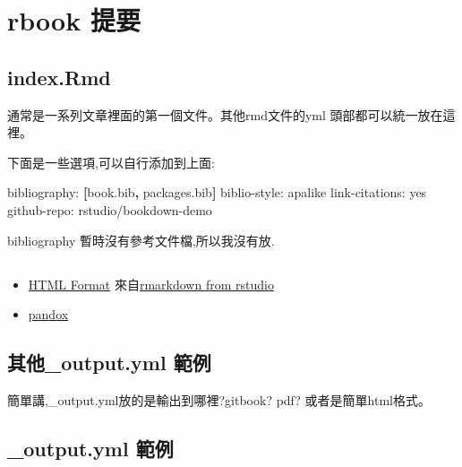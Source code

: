 \documentclass[]{book}
\newenvironment{Shaded}{\begin{snugshade}}{\end{snugshade}}
\newcommand{\AttributeTok}[1]{\textcolor[rgb]{0.77,0.63,0.00}{#1}}
\newcommand{\FunctionTok}[1]{\textcolor[rgb]{0.00,0.00,0.00}{#1}}
\newcommand{\KeywordTok}[1]{\textcolor[rgb]{0.13,0.29,0.53}{\textbf{#1}}}
\newcommand{\NormalTok}[1]{#1}
\providecommand{\tightlist}{%
  \setlength{\itemsep}{0pt}\setlength{\parskip}{0pt}}
\theoremstyle{definition}
\theoremstyle{definition}
\theoremstyle{definition}
\theoremstyle{remark}
\begin{document}
\hypertarget{rbook-}{%
\chapter{rbook 提要}\label{rbook-}}

\hypertarget{index.rmd}{%
\section{index.Rmd}\label{index.rmd}}

通常是一系列文章裡面的第一個文件。其他rmd文件的yml
頭部都可以統一放在這裡。

下面是一些選項,可以自行添加到上面:

\begin{Shaded}
\begin{Highlighting}[]
\FunctionTok{bibliography:}\AttributeTok{ }\KeywordTok{[}\NormalTok{book.bib}\KeywordTok{,}\NormalTok{ packages.bib}\KeywordTok{]}
\FunctionTok{biblio-style:}\AttributeTok{ apalike}
\FunctionTok{link-citations:}\AttributeTok{ yes}
\FunctionTok{github-repo:}\AttributeTok{ rstudio/bookdown-demo}
\end{Highlighting}
\end{Shaded}

bibliography 暫時沒有參考文件檔,所以我沒有放.

\hypertarget{section-1}{%
\section{}\label{section-1}}

\begin{itemize}
\tightlist
\item
  \href{https://rmarkdown.rstudio.com/r_notebook_format.html}{HTML
  Format} 來自\href{https://github.com/rstudio/rmarkdown}{rmarkdown from
  rstudio}
\item
  \href{http://conjugateprior.org/2012/12/r-markdown-to-other-document-formats/}{pandox}
\end{itemize}

\hypertarget{_output.yml-}{%
\section{其他\_output.yml 範例}\label{_output.yml-}}

簡單講,\_output.yml放的是輸出到哪裡?gitbook? pdf? 或者是簡單html格式。

\hypertarget{output.yml-}{%
\section{\_output.yml 範例}\label{output.yml-}}
\end{document}
